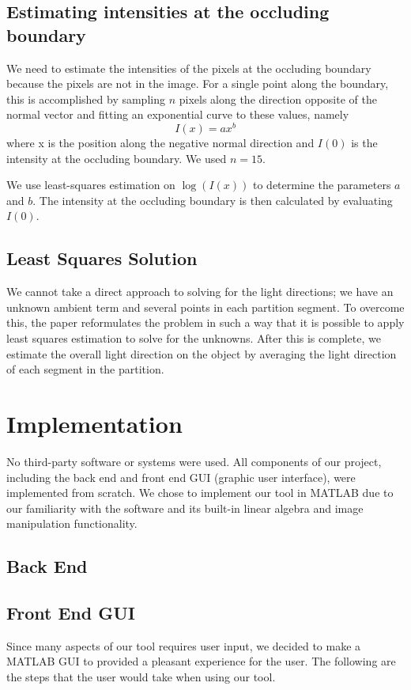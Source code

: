 \documentclass[10pt,twocolumn,letterpaper]{article}
\begin{document}
\subsection{Estimating intensities at the occluding boundary}
We need to estimate the intensities of the pixels at the occluding boundary because the pixels are not in the image. For a single point along the boundary, this is accomplished by sampling $n$ pixels along the direction opposite of the normal vector and fitting an exponential curve to these values, namely \[I(x) = ax^{b}\] where x is the position along the negative normal direction and $I(0)$ is the intensity at the occluding boundary. We used $n = 15$.

We use least-squares estimation on $\log(I(x))$ to determine the parameters $a$ and $b$. The intensity at the occluding boundary is then calculated by evaluating $I(0)$.

\subsection{Least Squares Solution}
We cannot take a direct approach to solving for the light directions; we have an unknown ambient term and several points in each partition segment. To overcome this, the paper reformulates the problem in such a way that it is possible to apply least squares estimation to solve for the unknowns. After this is complete, we estimate the overall light direction on the object by averaging the light direction of each segment in the partition.


\section{Implementation}

No third-party software or systems were used. All components of our project, including the back end and front end GUI (graphic user interface), were implemented from scratch. We chose to implement our tool in MATLAB due to our familiarity with the software and its built-in linear algebra and image manipulation functionality.

\subsection{Back End}

\subsection{Front End GUI}
Since many aspects of our tool requires user input, we decided to make a MATLAB GUI to provided a pleasant experience for the user. The following are the steps that the user would take when using our tool. 
\end{document}
